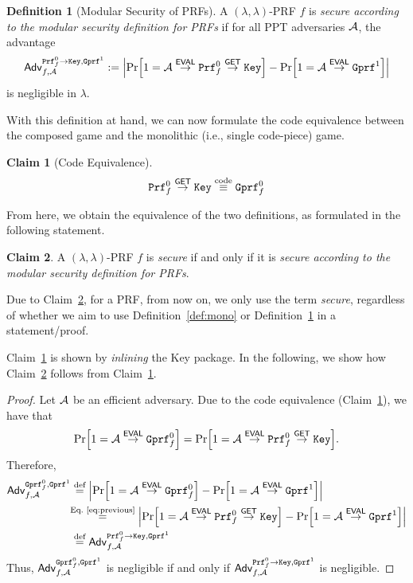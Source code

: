 \documentclass[a4paper,table,dvipsnames]{article}
\theoremstyle{definition}
\newtheorem{definition}{Definition}[section]
\newtheorem{claim}{Claim}
\newcommand{\M}[1]{\ensuremath{\text{\texttt{#1}}}}
\renewcommand{\O}[1]{\ensuremath{\mathsf{#1}}}
\begin{document}
\begin{definition}[Modular Security of PRFs]\label{def:modular}
A $(\lambda,\lambda)$-PRF $f$ is \emph{secure according to the modular security definition for PRFs}
 if for all PPT  adversaries $\mathcal{A}$, the advantage
\begin{align*}
  \mathsf{Adv}^{\M{Prf}_f^0\rightarrow\M{Key},\M{Gprf}^1}_{f,\adv}
:= \abs{\prob{1=\adv\stackrel{\O{EVAL}}{\rightarrow}\M{Prf}^0_f\stackrel{\O{GET}}{\rightarrow} \M{Key}}
  -\prob{1=\adv\stackrel{\O{EVAL}}{\rightarrow}\M{Gprf}^1}}
\end{align*}
is negligible in $\lambda$.
\end{definition}
With this definition at hand, we can now formulate the code equivalence between the composed game and the monolithic (i.e., single code-piece) game.
\begin{claim}[Code Equivalence]\label{claim:code-equiv}
\[\M{Prf}_f^0\stackrel{\O{GET}}{\rightarrow}\M{Key}\stackrel{\text{code}}{\equiv}\M{Gprf}_f^0\]
\end{claim}
From here, we obtain the equivalence of the two definitions, as formulated in the following statement.
\begin{claim}\label{claim:hopsdohops}
A $(\lambda,\lambda)$-PRF $f$ is \emph{secure} if and only if it is \emph{secure according to the modular security definition for PRFs}.
\end{claim}
Due to Claim~\ref{claim:hopsdohops}, for a PRF, from now on, we only use the term \emph{secure}, regardless of whether we aim to use Definition~\ref{def:mono} or Definition~\ref{def:modular} in a statement/proof.

Claim~\ref{claim:code-equiv} is shown by \emph{inlining} the Key package. In the following, we show how Claim~\ref{claim:hopsdohops} follows from Claim~\ref{claim:code-equiv}.

\begin{proof}
Let $\mathcal{A}$ be an efficient adversary. Due to the code equivalence (Claim~\ref{claim:code-equiv}), we have that 
\begin{equation}\label{eq:previous}
\prob{1=\adv\stackrel{\O{EVAL}}{\rightarrow}\M{Gprf}^0_f}=\prob{1=\adv\stackrel{\O{EVAL}}{\rightarrow}\M{Prf}^0_f\stackrel{\O{GET}}{\rightarrow}\M{Key}}.
\end{equation}
Therefore,
\begin{align*}
\mathsf{Adv}^{\M{Gprf}_f^0,\M{Gprf}^1}_{f,\adv} &\stackrel{\text{def}}{=}\abs{\prob{1=\adv\stackrel{\O{EVAL}}{\rightarrow}\M{Gprf}^0_f}-\prob{1=\adv\stackrel{\O{EVAL}}{\rightarrow}\M{Gprf}^1}}\\
&\!\!\stackrel{\text{Eq.~\ref{eq:previous}}}{=}\abs{\prob{1=\adv\stackrel{\O{EVAL}}{\rightarrow}\M{Prf}^0_f\stackrel{\O{GET}}{\rightarrow}\M{Key}}-\prob{1=\adv\stackrel{\O{EVAL}}{\rightarrow}\M{Gprf}^1}}\\
&\stackrel{\text{def}}{=}\mathsf{Adv}^{\M{Prf}_f^0\rightarrow\M{Key},\M{Gprf}^1}_{f,\adv}
\end{align*}
Thus, $\mathsf{Adv}^{\M{Gprf}_f^0,\M{Gprf}^1}_{f,\adv}$ is negligible if and only if $\mathsf{Adv}^{\M{Prf}_f^0\rightarrow\M{Key},\M{Gprf}^1}_{f,\adv}$ is negligible.
\end{proof}
\end{document}
